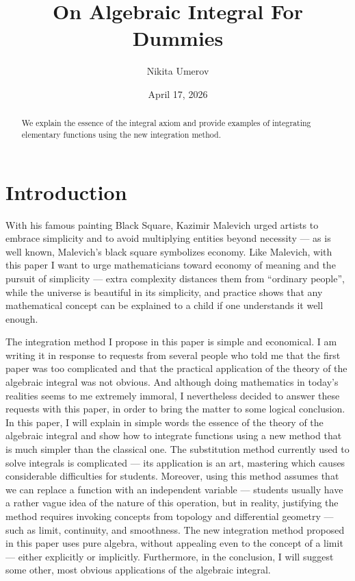 \documentclass[12pt]{article}
\title{On Algebraic Integral For Dummies}
\author{Nikita Umerov}
\date{April 17, 2026}
\theoremstyle{definition}
\begin{document}
\maketitle

\begin{abstract}
We explain the essence of the integral axiom and provide examples of integrating elementary 
functions using the new integration method.
\end{abstract}

\section*{Introduction}

With his famous painting Black Square, Kazimir Malevich urged artists to embrace simplicity 
and to avoid multiplying entities beyond necessity — as is well known, Malevich’s black square 
symbolizes economy. Like Malevich, with this paper I want to urge mathematicians toward economy of 
meaning and the pursuit of simplicity — extra complexity distances them from “ordinary people”, 
while the universe is beautiful in its simplicity, and practice shows that any mathematical concept can 
be explained to a child if one understands it well enough.

\vspace{5pt}

The integration method I propose in this paper is simple and economical. 
I am writing it in response to requests from several people who told me that 
the first paper \cite{umerov2025} was too complicated and that the practical application of the 
theory of the algebraic integral was not obvious. And although doing mathematics 
in today’s realities seems to me extremely immoral, I nevertheless decided to answer 
these requests with this paper, in order to bring the matter to some logical conclusion. 
In this paper, I will explain in simple words the essence of the theory of the algebraic 
integral and show how to integrate functions using a new method that is much simpler than the classical one. 
The substitution method currently used to solve integrals is complicated — 
its application is an art, mastering which causes considerable difficulties for students. 
Moreover, using this method assumes that we can replace a function with an independent variable — 
students usually have a rather vague idea of the nature of this operation, but in reality, 
justifying the method requires invoking concepts from topology and differential geometry — such as limit, 
continuity, and smoothness. The new integration method proposed in this paper uses pure algebra, 
without appealing even to the concept of a limit — either explicitly or implicitly. 
Furthermore, in the conclusion, I will suggest some other, most obvious applications of the algebraic integral.
\end{document}
